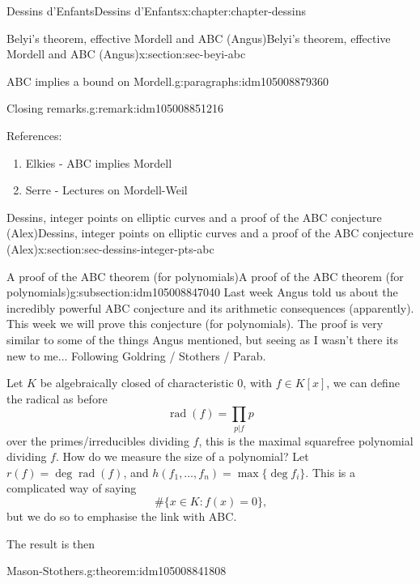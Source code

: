 \documentclass[oneside,10pt,]{book}
\numberwithin{equation}{section}
\newcommand{\lb}{[}
\newcommand{\rb}{]}
\begin{document}
\begin{chapterptx}{Dessins d'Enfants}{}{Dessins d'Enfants}{}{}{x:chapter:chapter-dessins}
\begin{sectionptx}{Belyi's theorem, effective Mordell and ABC (Angus)}{}{Belyi's theorem, effective Mordell and ABC (Angus)}{}{}{x:section:sec-beyi-abc}
\begin{paragraphs}{ABC implies a bound on Mordell.}{g:paragraphs:idm105008879360}
\begin{remark}{Closing remarks.}{g:remark:idm105008851216}
\end{remark}
References:%
\begin{enumerate}
\item{}Elkies - ABC implies Mordell%
\item{}Serre - Lectures on Mordell-Weil%
\end{enumerate}
%
\end{paragraphs}%
\end{sectionptx}
%
%
\typeout{************************************************}
\typeout{************************************************}
%
\begin{sectionptx}{Dessins, integer points on elliptic curves and a proof of the ABC conjecture (Alex)}{}{Dessins, integer points on elliptic curves and a proof of the ABC conjecture (Alex)}{}{}{x:section:sec-dessins-integer-pts-abc}
%
%
\typeout{************************************************}
\typeout{************************************************}
%
\begin{subsectionptx}{A proof of the ABC theorem (for polynomials)}{}{A proof of the ABC theorem (for polynomials)}{}{}{g:subsection:idm105008847040}
Last week Angus told us about the incredibly powerful ABC conjecture and its arithmetic consequences (apparently). This week we will prove this conjecture (for polynomials). The proof is very similar to some of the things Angus mentioned, but seeing as I wasn't there its new to me... Following Goldring \slash{} Stothers \slash{} Parab.%
\par
Let \(K\) be algebraically closed of characteristic 0, with \(f \in K\lb x \rb\), we can define the radical as before%
\begin{equation*}
\operatorname{rad}(f) = \prod_{p | f} p
\end{equation*}
over the primes\slash{}irreducibles dividing \(f\), this is the maximal squarefree polynomial dividing \(f\). How do we measure the size of a polynomial? Let \(r(f) = \deg \operatorname{rad}(f)\), and \(h(f_1, \ldots, f_n) = \max\{\deg f_i\}\). This is a complicated way of saying%
\begin{equation*}
\#\{x \in K : f(x) = 0 \}\text{,}
\end{equation*}
but we do so to emphasise the link with ABC.%
\par
The result is then%
\begin{theorem}{Mason-Stothers.}{}{g:theorem:idm105008841808}%

\end{theorem}
\end{subsectionptx}
\end{sectionptx}
\end{chapterptx}
\end{document}
